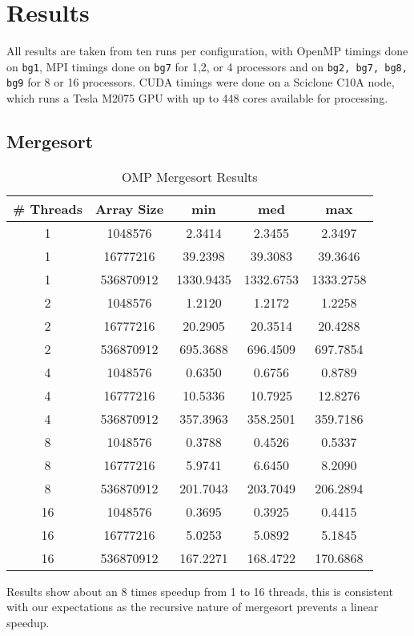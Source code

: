 \documentclass[conference,12pt]{IEEEtran}
\begin{document}
\section{Results}
	All results are taken from ten runs per configuration, with OpenMP timings done on \texttt{bg1}, MPI timings done on \texttt{bg7} for 1,2, or 4 processors and on \texttt{bg2, bg7, bg8, bg9} for 8 or 16 processors.  CUDA timings were done on a Sciclone C10A node, which runs a Tesla M2075 GPU with up to 448 cores available for processing.

	\subsection{Mergesort}
		\begin{table}[ht]
		\caption{OMP Mergesort Results} 
		\centering  
		\begin{tabular}{c c | c c c} 
		\hline\hline                        
		\# Threads & Array Size & min  & med & max\\ [0.5ex] %
		\hline                 
		1 & 1048576 & 2.3414 & 2.3455 & 2.3497  \\ 
		1 & 16777216 & 39.2398 & 39.3083 & 39.3646  \\
		1 & 536870912 & 1330.9435  & 1332.6753 &1333.2758    \\
		\hline
		2 & 1048576 & 1.2120 & 1.2172 & 1.2258  \\ 
		2 & 16777216 & 20.2905 & 20.3514 & 20.4288  \\
		2 & 536870912 & 695.3688  & 696.4509 &697.7854   \\
		\hline
		4 & 1048576 & 0.6350 & 0.6756 & 0.8789  \\ 
		4 & 16777216 & 10.5336 & 10.7925 & 12.8276  \\
		4 & 536870912 & 357.3963  & 358.2501 &359.7186   \\
		\hline
		8 & 1048576 & 0.3788 & 0.4526 & 0.5337  \\ 
		8 & 16777216 & 5.9741 & 6.6450 & 8.2090  \\
		8 & 536870912 & 201.7043  & 203.7049 &206.2894   \\
		\hline
		16 & 1048576 & 0.3695 & 0.3925 & 0.4415  \\
		16 & 16777216 & 5.0253 & 5.0892 & 5.1845  \\
		16 & 536870912 & 167.2271  & 168.4722 &170.6868 \\
		\hline 
		\end{tabular}
		\label{table:ompmerge} %
		\end{table}
		Results show about an 8 times speedup from 1 to 16 threads, this is consistent with our expectations as the recursive nature of mergesort prevents a linear speedup.  
\end{document}
